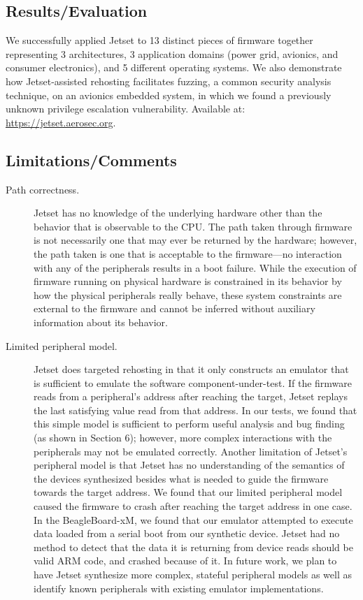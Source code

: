 \subsection{Results/Evaluation}
We successfully applied Jetset to 13 distinct pieces of firmware together representing 3 architectures, 3 application domains (power grid, avionics, and consumer electronics), and 5 different operating systems. We also demonstrate how Jetset-assisted rehosting facilitates fuzzing, a common security analysis technique, on an avionics embedded system, in which we found a previously unknown privilege escalation vulnerability. Available at: \url{https://jetset.aerosec.org}.
\subsection{Limitations/Comments}
\begin{description}
\item[Path correctness.] Jetset has no knowledge of the underlying hardware other than the behavior that is observable to the CPU. The path taken through firmware is not necessarily one that may ever be returned by the hardware; however, the path taken is one that is acceptable to the firmware—no interaction with any of the peripherals results in a boot failure. While the execution of firmware running on physical hardware is constrained in its behavior by how the physical peripherals really behave, these system constraints are external to the firmware and cannot be inferred without auxiliary information about its behavior. 

\item[Limited peripheral model.] Jetset does targeted rehosting in that it only constructs an emulator that is sufficient to emulate the software component-under-test. If the firmware reads from a peripheral’s address after reaching the target, Jetset replays the last satisfying value read from that address. In our tests, we found that this simple model is sufficient to perform useful analysis and bug finding (as shown in Section 6); however, more complex interactions with the peripherals may not be emulated correctly.  
Another limitation of Jetset’s peripheral model is that Jetset has no understanding of the semantics of the devices synthesized besides what is needed to guide the firmware towards the target address. We found that our limited peripheral model caused the firmware to crash after reaching the target address in one case. In the BeagleBoard-xM, we found that our emulator attempted to execute data loaded from a serial boot from our synthetic device. Jetset had no method to detect that the data it is returning from device reads should be valid ARM code, and crashed because of it.  In future work, we plan to have Jetset synthesize more complex, stateful peripheral models as well as identify known peripherals with existing emulator implementations.


\end{description}
